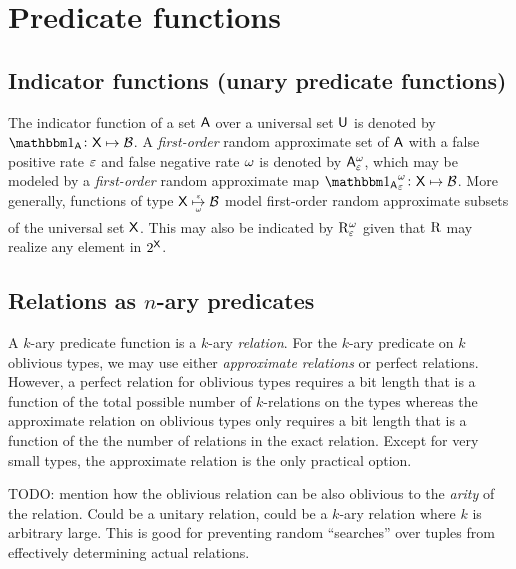 \documentclass[11pt,final,hidelinks]{article}
\begin{document}
\providecommand{\mainx}{..}
\section{Predicate functions}
\label{sec:pred}



\subsection{Indicator functions (unary predicate functions)}
The indicator function of a set $\Set{A}$ over a universal set $\Set{U}$ is denoted by $\SetIndicator{\Set{A}} \colon \Set{X} \mapsto \BitSet$.
A \emph{first-order} random approximate set of $\Set{A}$ with a false positive rate $\varepsilon$ and false negative rate $\omega$ is denoted by $\ASet{A}[\fprate][\fnrate]$, which may be modeled by a \emph{first-order} random approximate map $\APFun{\SetIndicator{\Set{A}}}[\fprate][\fnrate] \colon \Set{X} \mapsto \BitSet$.
More generally, functions of type $\Set{X} \ATOverUnder{\mapsto}[\fprate][\text{\raisebox{3pt}{$\fnrate$}}] \BitSet$ model first-order random approximate subsets of the universal set $\Set{X}$.
This may also be indicated by $\AT{\RV{R}}[\fprate][\fnrate]$ given that $\mathrm{R}$ may realize any element in $\PS{\Set{X}}$.


\subsection{Relations as $n$-ary predicates}

A $k$-ary predicate function is a $k$-ary \emph{relation}. For the $k$-ary predicate on $k$ oblivious types, we may use either \emph{approximate relations} or perfect relations. However, a perfect relation for oblivious types requires a bit length that is a function of the total possible number of $k$-relations on the types whereas the approximate relation on oblivious types only requires a bit length that is a function of the the number of relations in the exact relation.
Except for very small types, the approximate relation is the only practical option.

TODO: mention how the oblivious relation can be also oblivious to the \emph{arity} of the relation.
Could be a unitary relation, could be a $k$-ary relation where $k$ is arbitrary large. This is good for preventing random ``searches'' over tuples from effectively determining actual relations.
\end{document}
